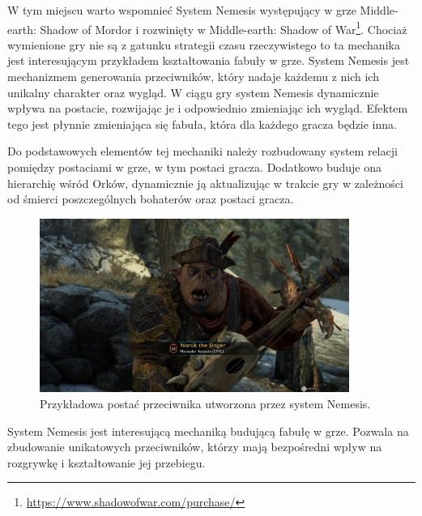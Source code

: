 W tym miejscu warto wspomnieć System Nemesis występujący w grze Middle-earth: Shadow of Mordor i rozwinięty w
Middle-earth: Shadow of War\footnote{\url{https://www.shadowofwar.com/purchase/}}. Chociaż wymienione gry nie są z gatunku strategii czasu rzeczywistego to ta mechanika jest
interesującym przykładem kształtowania fabuły w grze. System Nemesis jest mechanizmem generowania przeciwników, który nadaje
każdemu z nich ich unikalny charakter oraz wygląd. W ciągu gry system Nemesis dynamicznie wpływa na postacie, rozwijając
je i odpowiednio zmieniając ich wygląd. Efektem tego jest płynnie zmieniająca się fabuła, która dla każdego gracza
będzie inna.

Do podstawowych elementów tej mechaniki należy rozbudowany system relacji pomiędzy postaciami w grze, w tym postaci
gracza. Dodatkowo buduje ona hierarchię wśród Orków, dynamicznie ją aktualizując w trakcie gry w zależności od śmierci
poszczególnych bohaterów oraz postaci gracza.

\begin{figure}[h!]
    \centering
    \includegraphics[width=0.9\textwidth]{images/system_nemesis.jpg}
    \caption{Przykładowa postać przeciwnika utworzona przez system Nemesis.}
\end{figure}

System Nemesis jest interesującą mechaniką budującą fabułę w grze. Pozwala na zbudowanie unikatowych przeciwników,
którzy mają bezpośredni wpływ na rozgrywkę i kształtowanie jej przebiegu.